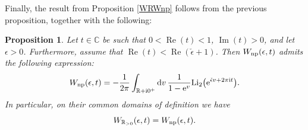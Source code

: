 \documentclass[pdftex]{sigma}
\numberwithin{equation}{section}
\newtheorem{Proposition}[Theorem]{Proposition}
 { \theoremstyle{definition}
\newtheorem{Definition}[Theorem]{Definition}
\newtheorem{Note}[Theorem]{Note}
\newtheorem{Example}[Theorem]{Example}
\newtheorem{Remark}[Theorem]{Remark} }
\begin{document}
Finally, the result from Proposition \ref{WRWnp} follows from the previous proposition, together with the following:

\begin{Proposition}\label{woronowiczlemma} Let $t\in \mathbb{C}$ be such that $0<\operatorname{Re}(t)<1$, $\operatorname{Im}(t)>0$, and let $\epsilon>0$. Furthermore, assume that $\operatorname{Re}(t)<\operatorname{Re}(\check\epsilon +1)$. Then $W_{\rm np}(\epsilon,t)$
admits the following expression:
\begin{equation*}%
 W_{\rm np}(\epsilon,t)=-\frac{1}{2\pi}\int_{\mathbb{R}+\mathrm{i}0^+}{\rm d}v\,\frac{1}{1-{\rm e}^v}\mathrm{Li}_2\big({\rm e}^{\check\epsilon v +2\pi \mathrm{i} t}\big).
\end{equation*}
In particular, on their common domains of definition we have
\begin{equation*}
 W_{\mathbb{R}_{>0}}(\epsilon,t)= W_{{\rm np}}(\epsilon,t).
\end{equation*}
\end{Proposition}
\end{document}
